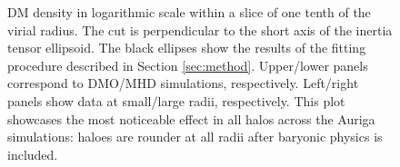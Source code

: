 \documentclass[usenatbib]{mnras}
\begin{document}
\begin{figure}
  \hfill
  \hfill 
  \caption{DM density in logarithmic scale within a slice of one tenth
    of the virial radius.
    The cut is perpendicular to the short axis of the inertia tensor ellipsoid.
    The black ellipses show the results of the fitting procedure
    described in Section \ref{sec:method}. 
    Upper/lower panels correspond to DMO/MHD simulations, respectively.
    Left/right panels show data at small/large radii, respectively.
    This plot showcases the most noticeable effect in all halos
    across the Auriga simulations: haloes are rounder at all radii
    after baryonic physics is included.}
\label{fig:slices}
\end{figure}
\end{document}
